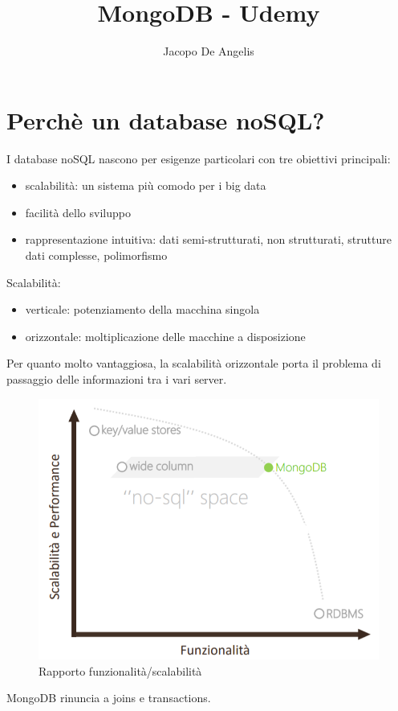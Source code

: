 \documentclass[11pt,a4paper]{book}
\begin{document}
\title{MongoDB - Udemy}
\author{Jacopo De Angelis}
\maketitle

\pagebreak
\tableofcontents
\pagebreak

\chapter{Perchè un database noSQL?}
I database noSQL nascono per esigenze particolari con tre obiettivi principali:
\begin{itemize}
	\item scalabilità: un sistema più comodo per i big data 
	\item facilità dello sviluppo
	\item rappresentazione intuitiva: dati semi-strutturati, non strutturati, strutture dati complesse, polimorfismo
\end{itemize}

Scalabilità:
\begin{itemize}
	\item verticale: potenziamento della macchina singola
	\item orizzontale: moltiplicazione delle macchine a disposizione
\end{itemize}
Per quanto molto vantaggiosa, la scalabilità orizzontale porta il problema di passaggio delle informazioni tra i vari server.
\begin{figure}[h!]
	\begin{center}
		\includegraphics[scale=0.6]{img/001.png}
		\caption{Rapporto funzionalità/scalabilità}
		\label{fig: 001}
	\end{center}
\end{figure}
MongoDB rinuncia a joins e transactions.
\end{document}
